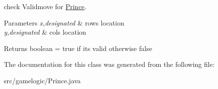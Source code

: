 check Validmove for \mbox{\hyperlink{classgamelogic_1_1_prince}{Prince}}. 
\begin{DoxyParams}{Parameters}
{\em x,designated} & row\textquotesingle{}s location \\
\hline
{\em y,designated} & col\textquotesingle{}s location \\
\hline
\end{DoxyParams}
\begin{DoxyReturn}{Returns}
boolean = true if it\textquotesingle{}s valid otherwise false 
\end{DoxyReturn}


The documentation for this class was generated from the following file\+:\begin{DoxyCompactItemize}
\item 
src/gamelogic/Prince.\+java\end{DoxyCompactItemize}
